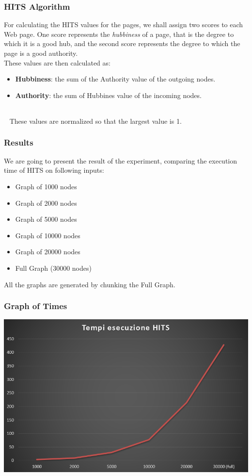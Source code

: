 \documentclass{beamer}
\begin{document}
\begin{frame}
\frametitle{HITS Algorithm}
For calculating the HITS values for the pages, we shall assign two scores to each Web page.
One score represents the \textit{hubbiness} of a page, that is the degree to which it
is a good hub, and the second score represents the degree to which the page
is a good authority.\\
\medskip
These values  are then calculated as:
\begin{itemize}
\item {} \textbf{Hubbiness}: the sum of the Authority value of the outgoing nodes.
\item {} \textbf{Authority}: the sum of Hubbines value of the incoming nodes.
\end{itemize}
\-\\\
\smallskip
\onslide<3-> These values are normalized so that the largest value is 1.
\end{frame}

\begin{frame}
\frametitle{Results}
We are going to present the result of the experiment, comparing the \alert{execution time} of HITS on following inputs:
\begin{itemize}
\item Graph of 1000 nodes
\item Graph of 2000 nodes
\item Graph of 5000 nodes
\item Graph of 10000 nodes
\item Graph of 20000 nodes
\item Full Graph (30000 nodes) 
\end{itemize}
All the graphs are generated by chunking the Full Graph.
\end{frame}

\begin{frame}
\frametitle{Graph of Times}
\includegraphics[scale=0.5]{img/Ranking/HITS.PNG} 
\end{frame}
\end{document}
